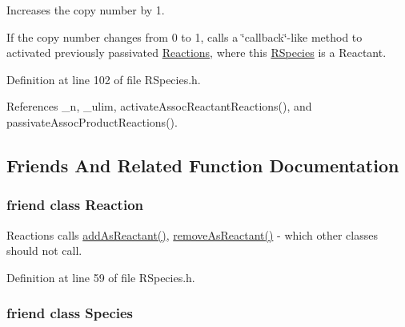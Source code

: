 Increases the copy number by 1. 

If the copy number changes from 0 to 1, calls a \char`\"{}callback\char`\"{}-\/like method to activated previously passivated \hyperlink{classchem_1_1Reaction}{Reactions}, where this \hyperlink{classchem_1_1RSpecies}{R\-Species} is a Reactant. 

Definition at line 102 of file R\-Species.\-h.



References \-\_\-n, \-\_\-ulim, activate\-Assoc\-Reactant\-Reactions(), and passivate\-Assoc\-Product\-Reactions().



\subsection{Friends And Related Function Documentation}
\hypertarget{classchem_1_1RSpecies_a5f86463029cca47f8aa15ff8cd5b9e51}{
\subsubsection[{Reaction}]{\setlength{\rightskip}{0pt plus 5cm}friend class {\bf Reaction}}}\label{classchem_1_1RSpecies_a5f86463029cca47f8aa15ff8cd5b9e51}


Reactions calls \hyperlink{classchem_1_1RSpecies_a88c4e30858e503105a3fa39e649060ef}{add\-As\-Reactant()}, \hyperlink{classchem_1_1RSpecies_ad0a8e2da5b7a0362b1fb20ad72671005}{remove\-As\-Reactant()} -\/ which other classes should not call. 



Definition at line 59 of file R\-Species.\-h.

\hypertarget{classchem_1_1RSpecies_a4f9920dbd864c252e3275a3f4f09dd84}{
\subsubsection[{Species}]{\setlength{\rightskip}{0pt plus 5cm}friend class {\bf Species}}}\label{classchem_1_1RSpecies_a4f9920dbd864c252e3275a3f4f09dd84}


